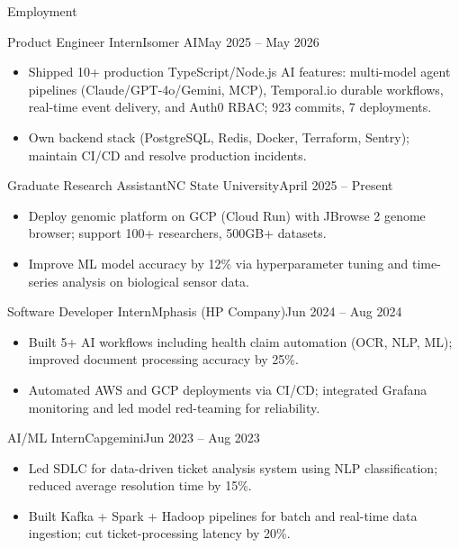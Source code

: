 \documentclass[]{mcdowellcv}
\begin{document}
\makeheader

\begin{cvsection}{Employment}
  \begin{cvsubsection}{Product Engineer Intern}{Isomer AI}{May 2025 -- May 2026}
    \begin{itemize}
      \item Shipped 10+ production TypeScript/Node.js AI features: multi-model agent pipelines (Claude/GPT-4o/Gemini, MCP), Temporal.io durable workflows, real-time event delivery, and Auth0 RBAC; 923 commits, 7 deployments.
      \item Own backend stack (PostgreSQL, Redis, Docker, Terraform, Sentry); maintain CI/CD and resolve production incidents.
    \end{itemize}
    \vspace{-1.5pt}
  \end{cvsubsection}

  \begin{cvsubsection}{Graduate Research Assistant}{NC State University}{April 2025 -- Present}
    \begin{itemize}
      \item Deploy genomic platform on GCP (Cloud Run) with JBrowse 2 genome browser; support 100+ researchers, 500GB+ datasets.
      \item Improve ML model accuracy by 12\% via hyperparameter tuning and time-series analysis on biological sensor data.
    \end{itemize}
    \vspace{-1.5pt}
  \end{cvsubsection}

  \begin{cvsubsection}{Software Developer Intern}{Mphasis (HP Company)}{Jun 2024 -- Aug 2024}
    \begin{itemize}
      \item Built 5+ AI workflows including health claim automation (OCR, NLP, ML); improved document processing accuracy by 25\%.
      \item Automated AWS and GCP deployments via CI/CD; integrated Grafana monitoring and led model red-teaming for reliability.
    \end{itemize}
    \vspace{-1.5pt}
  \end{cvsubsection}

  \begin{cvsubsection}{AI/ML Intern}{Capgemini}{Jun 2023 -- Aug 2023}
    \begin{itemize}
      \item Led SDLC for data-driven ticket analysis system using NLP classification; reduced average resolution time by 15\%.
      \item Built Kafka + Spark + Hadoop pipelines for batch and real-time data ingestion; cut ticket-processing latency by 20\%.
    \end{itemize}
    \vspace{-1.5pt}
  \end{cvsubsection}
\end{cvsection}
\end{document}
